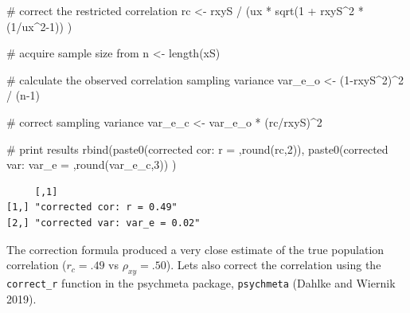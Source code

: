 \documentclass[
  letterpaper,
  DIV=11,
  numbers=noendperiod]{scrreprt}
\newenvironment{Shaded}{\begin{snugshade}}{\end{snugshade}}
\newcommand{\CommentTok}[1]{\textcolor[rgb]{0.37,0.37,0.37}{#1}}
\newcommand{\DecValTok}[1]{\textcolor[rgb]{0.68,0.00,0.00}{#1}}
\newcommand{\FunctionTok}[1]{\textcolor[rgb]{0.28,0.35,0.67}{#1}}
\newcommand{\NormalTok}[1]{\textcolor[rgb]{0.00,0.23,0.31}{#1}}
\newcommand{\OtherTok}[1]{\textcolor[rgb]{0.00,0.23,0.31}{#1}}
\newcommand{\SpecialCharTok}[1]{\textcolor[rgb]{0.37,0.37,0.37}{#1}}
\newcommand{\StringTok}[1]{\textcolor[rgb]{0.13,0.47,0.30}{#1}}
\begin{document}
\begin{Shaded}
\begin{Highlighting}[]
\CommentTok{\# correct the restricted correlation}
\NormalTok{rc }\OtherTok{\textless{}{-}}\NormalTok{ rxyS }\SpecialCharTok{/}\NormalTok{ (ux }\SpecialCharTok{*} \FunctionTok{sqrt}\NormalTok{(}\DecValTok{1} \SpecialCharTok{+}\NormalTok{ rxyS}\SpecialCharTok{\^{}}\DecValTok{2} \SpecialCharTok{*}\NormalTok{ (}\DecValTok{1}\SpecialCharTok{/}\NormalTok{ux}\SpecialCharTok{\^{}}\DecValTok{2{-}1}\NormalTok{)) )}

\CommentTok{\# acquire sample size from }
\NormalTok{n }\OtherTok{\textless{}{-}} \FunctionTok{length}\NormalTok{(xS)}

\CommentTok{\# calculate the observed correlation sampling variance}
\NormalTok{var\_e\_o }\OtherTok{\textless{}{-}}\NormalTok{ (}\DecValTok{1}\SpecialCharTok{{-}}\NormalTok{rxyS}\SpecialCharTok{\^{}}\DecValTok{2}\NormalTok{)}\SpecialCharTok{\^{}}\DecValTok{2} \SpecialCharTok{/}\NormalTok{ (n}\DecValTok{{-}1}\NormalTok{)}

\CommentTok{\# correct sampling variance}
\NormalTok{var\_e\_c }\OtherTok{\textless{}{-}}\NormalTok{ var\_e\_o }\SpecialCharTok{*}\NormalTok{ (rc}\SpecialCharTok{/}\NormalTok{rxyS)}\SpecialCharTok{\^{}}\DecValTok{2}

\CommentTok{\# print results}
\FunctionTok{rbind}\NormalTok{(}\FunctionTok{paste0}\NormalTok{(}\StringTok{\textquotesingle{}corrected cor: r = \textquotesingle{}}\NormalTok{,}\FunctionTok{round}\NormalTok{(rc,}\DecValTok{2}\NormalTok{)),}
      \FunctionTok{paste0}\NormalTok{(}\StringTok{\textquotesingle{}corrected var: var\_e = \textquotesingle{}}\NormalTok{,}\FunctionTok{round}\NormalTok{(var\_e\_c,}\DecValTok{3}\NormalTok{))}
\NormalTok{      )}
\end{Highlighting}
\end{Shaded}

\begin{verbatim}
     [,1]                         
[1,] "corrected cor: r = 0.49"    
[2,] "corrected var: var_e = 0.02"
\end{verbatim}

The correction formula produced a very close estimate of the true
population correlation (\(r_c = .49\) vs \(\rho_{xy}=.50\)). Lets also
correct the correlation using the \texttt{correct\_r} function in the
psychmeta package, \texttt{psychmeta} (Dahlke and Wiernik 2019).
\end{document}
